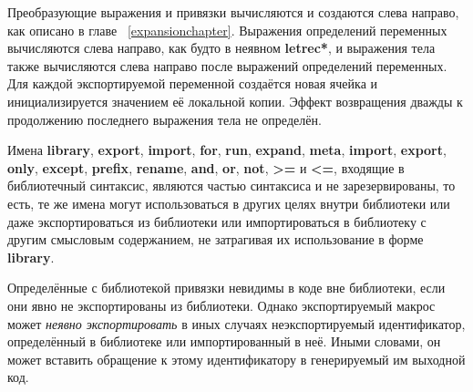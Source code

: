 Преобразующие выражения и привязки вычисляются и создаются слева направо, как описано в главе
~\ref{expansionchapter}. Выражения определений переменных вычисляются слева направо, как будто в
неявном {\cf\bfseries letrec*}, и выражения тела также вычисляются слева направо после выражений
определений переменных. Для каждой экспортируемой переменной создаётся новая ячейка и
инициализируется значением её локальной копии. Эффект возвращения дважды к продолжению
последнего выражения тела не определён.\vspace{1mm}

\begin{note}
Имена {\cf\bfseries library}, {\cf\bfseries export}, {\cf\bfseries import}, {\cf\bfseries for},
{\cf\bfseries run}, {\cf\bfseries expand}, {\cf\bfseries meta}, {\cf\bfseries import},
{\cf\bfseries export}, {\cf\bfseries only}, {\cf\bfseries except}, {\cf\bfseries prefix},
{\cf\bfseries rename}, {\cf\bfseries and}, {\cf\bfseries or}, {\cf\bfseries not}, {\cf\bfseries
  >=} и {\cf\bfseries <=}, входящие в библиотечный синтаксис, являются частью синтаксиса и не
зарезервированы, то есть, те же имена могут использоваться в других целях внутри
библиотеки или даже экспортироваться из библиотеки или импортироваться в библиотеку с другим
смысловым содержанием, не затрагивая их использование в форме {\cf\bfseries library}.
\end{note}

Определённые с библиотекой привязки невидимы в коде вне библиотеки, если они явно не
экспортированы из библиотеки. Однако экспортируемый макрос может \emph{неявно экспортировать}
в иных случаях неэкспортируемый идентификатор, определённый в библиотеке или
импортированный в неё. Иными словами, он может вставить обращение к этому идентификатору
в генерируемый им выходной код.

